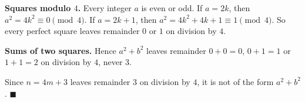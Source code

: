 \textbf{Squares modulo $4$.} Every integer $a$ is even or odd. If $a=2k$, then $a^2=4k^2\equiv0\pmod4$. If $a=2k+1$, then $a^2=4k^2+4k+1\equiv1\pmod4$. So every perfect square leaves remainder $0$ or $1$ on division by $4$.

\textbf{Sums of two squares.} Hence $a^2+b^2$ leaves remainder $0+0=0$, $0+1=1$ or $1+1=2$ on division by $4$, never $3$.

Since $n=4m+3$ leaves remainder $3$ on division by $4$, it is not of the form $a^2+b^2$. $\blacksquare$
